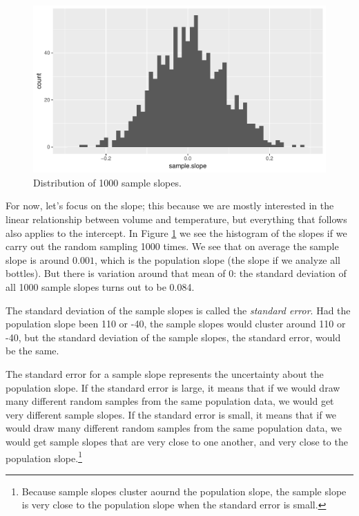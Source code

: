 \documentclass[]{report}\usepackage[]{graphicx}\usepackage[]{color}
\makeatletter
\def\maxwidth{ %
  \ifdim\Gin@nat@width>\linewidth
    \linewidth
  \else
    \Gin@nat@width
  \fi
}
\newenvironment{knitrout}{}{} %
\makeatother
\begin{document}
\begin{knitrout}
\color{fgcolor}\begin{figure}

{\centering \includegraphics[width=\maxwidth]{figure/inf_5-1} 

}

\caption[Distribution of 1000 sample slopes]{Distribution of 1000 sample slopes.}\label{fig:inf_5}
\end{figure}


\end{knitrout}

For now, let's focus on the slope; this because we are mostly interested in the linear relationship between volume and temperature, but everything that follows also applies to the intercept. In Figure \ref{fig:inf_5} we see the histogram of the slopes if we carry out the random sampling 1000 times. We see that on average the sample slope is around $0.001$, which is the population slope (the slope if we analyze all bottles). But there is variation around that mean of 0: the standard deviation of all 1000 sample slopes turns out to be 0.084.


The standard deviation of the sample slopes is called the \textit{standard error}. Had the population slope been 110 or -40, the sample slopes would cluster around 110 or -40, but the standard deviation of the sample slopes, the standard error, would be the same.

The standard error for a sample slope represents the uncertainty about the population slope. If the standard error is large, it means that if we would draw many different random samples from the same population data, we would get very different sample slopes. If the standard error is small, it means that if we would draw many different random samples from the same population data, we would get sample slopes that are very close to one another, and very close to the population slope.\footnote{Because sample slopes cluster aournd the population slope, the sample slope is very close to the population slope when the standard error is small.}
\end{document}
